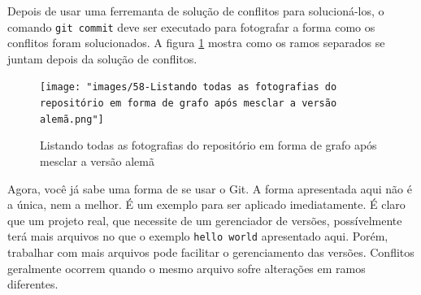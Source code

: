 \documentclass[a4paper]{book}
\begin{document}
Depois de usar uma ferremanta de solução de conflitos
para solucioná-los, o comando \texttt{git commit}
deve ser executado para fotografar a forma como
os conflitos foram solucionados.
%
A figura \ref{fig:58} mostra como os ramos separados 
se juntam depois da solução de conflitos.

\begin{figure}[!h]
\caption{Listando todas as fotografias do repositório em forma de grafo após mesclar a versão alemã}
\label{fig:58}
\centering
\texttt{[image: "images/58-Listando todas as fotografias do repositório em forma de grafo após mesclar a versão alemã.png"]}
\end{figure}

Agora, você já sabe uma forma de se usar o Git.
A forma apresentada aqui não é a única, nem a melhor. 
É um exemplo para ser aplicado imediatamente.
É claro que um projeto real, que necessite de um
gerenciador de versões, possívelmente terá mais arquivos
no que o exemplo \texttt{hello world} apresentado aqui.
Porém, trabalhar com mais arquivos pode facilitar o
gerenciamento das versões.
Conflitos geralmente ocorrem quando o mesmo arquivo
sofre alterações em ramos diferentes.





\end{document}
